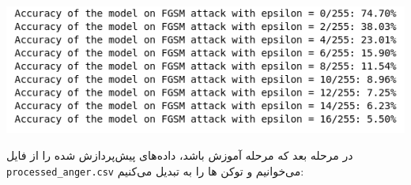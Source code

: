 \begin{qsolve}
	
	\begin{center}
		\includegraphics*[width=1\linewidth]{pics/img6.png}
		\label{دیتاست پردازش شده}
	\end{center}
	
	
	
	
	در مرحله بعد که مرحله آموزش باشد، داده‌های پیش‌پردازش شده را از فایل \texttt{processed\_anger.csv} می‌خوانیم و توکن ها را به  تبدیل می‌کنیم:
\end{qsolve}



